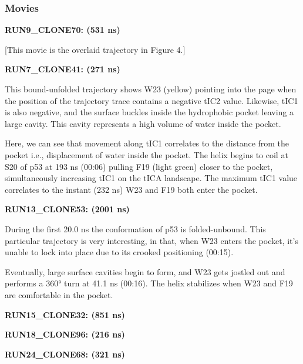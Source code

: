 \clearpage
\subsubsection{Movies}

\noindent\textbf{RUN9\_CLONE70: (531 ns)}

{[}This movie is the overlaid trajectory in Figure 4.{]}

\noindent\textbf{RUN7\_CLONE41: (271 ns)}

This bound-unfolded trajectory shows W23 (yellow) pointing into the page
when the position of the trajectory trace contains a negative tIC2
value. Likewise, tIC1 is also negative, and the surface buckles inside
the hydrophobic pocket leaving a large cavity. This cavity represents a
high volume of water inside the pocket.

Here, we can see that movement along tIC1 correlates to the distance
from the pocket i.e., displacement of water inside the pocket. The helix
begins to coil at S20 of p53 at 193 ns (00:06) pulling F19 (light green)
closer to the pocket, simultaneously increasing tIC1 on the tICA
landscape. The maximum tIC1 value correlates to the instant (232 ns) W23
and F19 both enter the pocket.

\noindent\textbf{RUN13\_CLONE53: (2001 ns)}

During the first 20.0 ns the conformation of p53 is folded-unbound. This
particular trajectory is very interesting, in that, when W23 enters the
pocket, it's unable to lock into place due to its crooked positioning
(00:15).

Eventually, large surface cavities begin to form, and W23 gets jostled
out and performs a 360° turn at 41.1 ns (00:16). The helix stabilizes
when W23 and F19 are comfortable in the pocket.

\noindent\textbf{RUN15\_CLONE32: (851 ns)}

\noindent\textbf{RUN18\_CLONE96: (216 ns)}

\noindent\textbf{RUN24\_CLONE68: (321 ns)}





